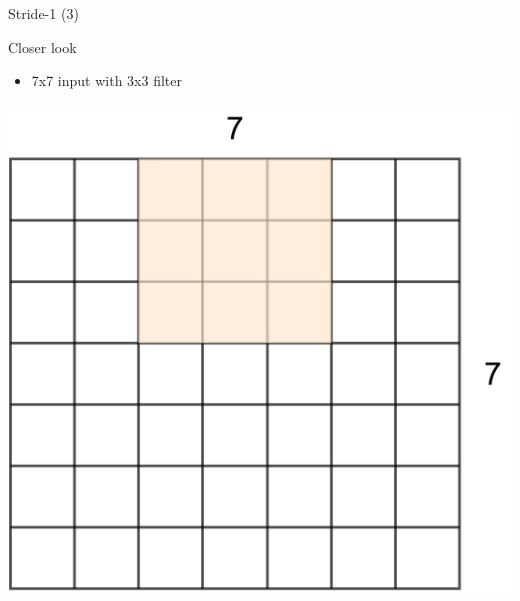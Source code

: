 \documentclass[default, aspectratio=169]{beamer}
\begin{document}
	\begin{frame}{Stride-1 (3)}
		\vspace{0.5cm}
		
		\normalsize Closer look
		\begin{itemize}
			\item 7x7 input with 3x3 filter
		\end{itemize}
		
		\centering
		\includegraphics[keepaspectratio, scale=0.25]{pic/Stride3.png}
	\end{frame}
\end{document}
